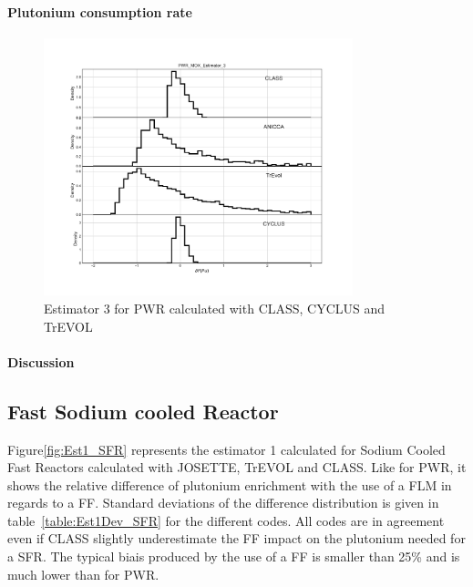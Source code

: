 \paragraph{Plutonium consumption rate}
\begin{figure}[h]
	\begin{center}
		\includegraphics[width = 0.8\textwidth]{../../Feature_1/RAW_DATA/FIG/PWR_MOX_Estimator_3.pdf}
		\caption{Estimator 3 for PWR calculated with CLASS, CYCLUS and TrEVOL}
		\label{fig:Est3_PWR}
	\end{center}
\end{figure}


\paragraph{Discussion}

\subsection{Fast Sodium cooled Reactor}

Figure\ref{fig:Est1_SFR} represents the estimator 1 calculated for Sodium Cooled Fast Reactors calculated with JOSETTE, TrEVOL and CLASS. Like for PWR, it shows the relative difference of plutonium enrichment with the use of a FLM in regards to a FF. Standard deviations of the difference distribution is given in table~\ref{table:Est1Dev_SFR} for the different codes. 
All codes are in agreement even if CLASS slightly underestimate the FF impact on the plutonium needed for a SFR. The typical biais produced by the use of a FF is smaller than 25\% and is much lower than for PWR.  

